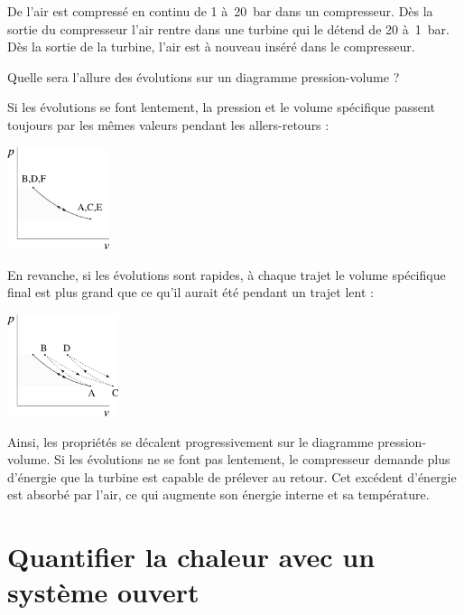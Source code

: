 		\clearfloats %
		\begin{anexample}
			De l’air est compressé en continu de 1 à~\SI{20}{\bar} dans un compresseur. Dès la sortie du compresseur l’air rentre dans une turbine qui le détend de 20 à~\SI{1}{\bar}. Dès la sortie de la turbine, l’air est à nouveau inséré dans le compresseur.
			
			Quelle sera l’allure des évolutions sur un diagramme pression-volume ?
					\begin{answer}
						Si les évolutions se font lentement, la pression et le volume spécifique passent toujours par les mêmes valeurs pendant les allers-retours :
							\begin{center}
								\includegraphics[height=3cm]{images/exe_pv_rev_so.png}
							\end{center}
						En revanche, si les évolutions sont rapides, à chaque trajet le volume spécifique final est plus grand que ce qu’il aurait été pendant un trajet lent :
							\begin{center}
								\includegraphics[height=3cm]{images/exe_pv_irr_so.png}
							\end{center}
						Ainsi, les propriétés se décalent progressivement sur le diagramme pression-volume. Si les évolutions ne se font pas lentement, le compresseur demande plus d’énergie que la turbine est capable de prélever au retour. Cet excédent d’énergie est absorbé par l’air, ce qui augmente son énergie interne et sa température.
					\end{answer}

		\end{anexample}
	
\section{Quantifier la chaleur avec un système ouvert}

